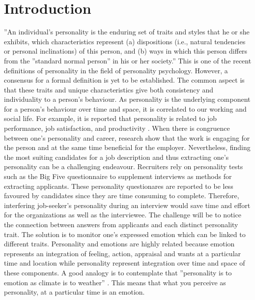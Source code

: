 \chapter{Introduction}

''An individual's personality is the enduring set of traits and styles that he or she exhibits, which characteristics represent (a) dispositions (i.e., natural tendencies or personal inclinations) of this person, and (b) ways in which this person differs from the ''standard normal person'' in his or her society.'' \cite{personality-definition-BERGNER2020100759} This is one of the recent definitions of personality in the field of personality psychology. However, a consensus for a formal definition is yet to be established. The common aspect is that these traits and unique characteristics give both consistency and individuality to a person's behaviour. As personality is the underlying component for a person's behaviour over time and space, it is correlated to our working and social life. For example, it is reported that personality is related to job performance, job satisfaction, and productivity \cite{personality-prediction-questions-9121971}. When there is congruence between one’s personality and career, research show that the work is engaging for the person and at the same time beneficial for the employer. Nevertheless, finding the most suiting candidates for a job description and thus extracting one's personality can be a challenging endeavour. Recruiters rely on personality tests such as the Big Five questionnaire to supplement interviews as methods for extracting applicants. These personality questionares are reported to be less favoured by candidates since they are time consuming to complete. Therefore, interfering job-seeker's personality during an interview would save time and effort for the organizations as well as the interviewee. The challenge will be to notice the connection between answers from applicants and each distinct personality trait. The solution is to monitor one's expressed emotion  which can be linked to different traits. Personality and emotions are highly related because emotion represents an integration of feeling, action, appraisal and wants at a particular time and location while personality represent integration over time and space of these components. A good analogy is to contemplate that ''personality is to emotion as climate is to weather'' \cite{personality-and-emotion-revelle2009personality}. This means that what you perceive as personality, at a particular time is an emotion.  \\ 

